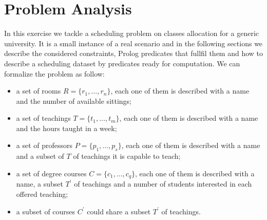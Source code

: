 \documentclass[10pt,a4paper]{article} %
\begin{document}
    \title{\rmfamily\normalfont{}}
    \author{}
    \date{\today}

    \maketitle

    \begin{abstract}
        This short document explains my work to support
        AI exam, taught by Prof. Paolo Frasconi at University of Florence,
        comments some results and shows how to reproduce test cases.
        I implemented a Prolog program that produce a schedule for the
        problem at hand, satisfying the requested constraints.
    \end{abstract}


    \section{Problem Analysis}
    In this exercise we tackle a scheduling problem on classes allocation
    for a generic university. It is a small instance of a real scenario
    and in the following sections we describe the considered constraints,
    Prolog predicates that fullfil them and how to describe a scheduling
    dataset by predicates ready for computation.
    We can formalize the problem as follow:
    \begin{itemize}
        \item a set of rooms $R = \lbrace r_1, \ldots, r_n \rbrace$, each
            one of them is described with a name and the number
            of available sittings;
        \item a set of teachings $T = \lbrace t_1, \ldots, t_m \rbrace$, each
            one of them is described with a name and the hours taught in a week;
        \item a set of professors $P = \lbrace p_1, \ldots, p_s \rbrace$, each
            one of them is described with a name and a subset of $T$ of teachings
            it is capable to teach;
        \item a set of degree courses $C = \lbrace c_1, \ldots, c_q \rbrace$, each
            one of them is described with a name, a subset $T^\prime$ of teachings
            and a number of students interested in each offered teaching;
        \item a subset of courses $C^\prime$ could share a subset $T^\prime$ of teachings.
    \end{itemize}
\end{document}

